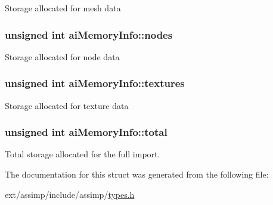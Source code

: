 Storage allocated for mesh data \hypertarget{structai_memory_info_a5a084942c81a29f7bb03c9903430b033}{
\subsubsection[{nodes}]{\setlength{\rightskip}{0pt plus 5cm}unsigned int ai\-Memory\-Info\-::nodes}}\label{structai_memory_info_a5a084942c81a29f7bb03c9903430b033}
Storage allocated for node data \hypertarget{structai_memory_info_a32817d13f0e280777e49769f8c46f168}{
\subsubsection[{textures}]{\setlength{\rightskip}{0pt plus 5cm}unsigned int ai\-Memory\-Info\-::textures}}\label{structai_memory_info_a32817d13f0e280777e49769f8c46f168}
Storage allocated for texture data \hypertarget{structai_memory_info_a590739a4cef4876901d1cf6ff48f01b3}{
\subsubsection[{total}]{\setlength{\rightskip}{0pt plus 5cm}unsigned int ai\-Memory\-Info\-::total}}\label{structai_memory_info_a590739a4cef4876901d1cf6ff48f01b3}
Total storage allocated for the full import. 

The documentation for this struct was generated from the following file\-:\begin{DoxyCompactItemize}
\item 
ext/assimp/include/assimp/\hyperlink{types_8h}{types.\-h}\end{DoxyCompactItemize}
